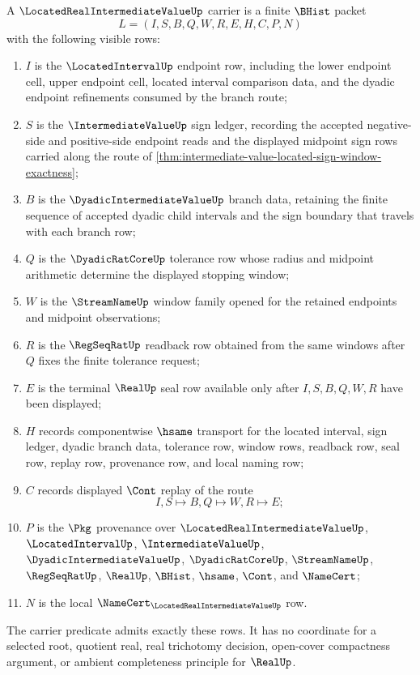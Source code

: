 \begin{definition}
\label{def:located-real-intermediate-value-carrier}
A $\LocatedRealIntermediateValueUp$ carrier is a finite $\BHist$ packet
$$
L=(I,S,B,Q,W,R,E,H,C,P,N)
$$
with the following visible rows:
\begin{enumerate}
\item $I$ is the $\LocatedIntervalUp$ endpoint row, including the lower endpoint cell, upper endpoint cell, located interval comparison data, and the dyadic endpoint refinements consumed by the branch route;
\item $S$ is the $\IntermediateValueUp$ sign ledger, recording the accepted negative-side and positive-side endpoint reads and the displayed midpoint sign rows carried along the route of \autoref{thm:intermediate-value-located-sign-window-exactness};
\item $B$ is the $\DyadicIntermediateValueUp$ branch data, retaining the finite sequence of accepted dyadic child intervals and the sign boundary that travels with each branch row;
\item $Q$ is the $\DyadicRatCoreUp$ tolerance row whose radius and midpoint arithmetic determine the displayed stopping window;
\item $W$ is the $\StreamNameUp$ window family opened for the retained endpoints and midpoint observations;
\item $R$ is the $\RegSeqRatUp$ readback row obtained from the same windows after $Q$ fixes the finite tolerance request;
\item $E$ is the terminal $\RealUp$ seal row available only after $I,S,B,Q,W,R$ have been displayed;
\item $H$ records componentwise $\hsame$ transport for the located interval, sign ledger, dyadic branch data, tolerance row, window rows, readback row, seal row, replay row, provenance row, and local naming row;
\item $C$ records displayed $\Cont$ replay of the route
$$
I,S \longmapsto B,Q \longmapsto W,R \longmapsto E ;
$$
\item $P$ is the $\Pkg$ provenance over $\LocatedRealIntermediateValueUp$, $\LocatedIntervalUp$, $\IntermediateValueUp$, $\DyadicIntermediateValueUp$, $\DyadicRatCoreUp$, $\StreamNameUp$, $\RegSeqRatUp$, $\RealUp$, $\BHist$, $\hsame$, $\Cont$, and $\NameCert$;
\item $N$ is the local $\NameCert_{\LocatedRealIntermediateValueUp}$ row.
\end{enumerate}
The carrier predicate admits exactly these rows. It has no coordinate for a selected root, quotient real, real trichotomy decision, open-cover compactness argument, or ambient completeness principle for $\RealUp$.
\end{definition}

